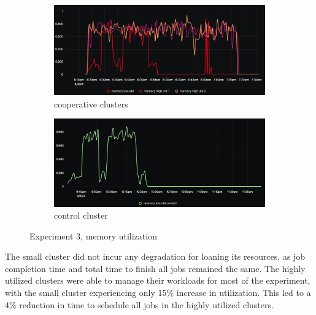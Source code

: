 \begin{figure}[H]
\centering
\begin{subfigure}{.5\textwidth}
  \centering
  \includegraphics[width=.9\linewidth]{./figures/experiment-three/cooperative.png}
  \caption{cooperative clusters}
  \label{fig:exp3coop}
\end{subfigure}%
\begin{subfigure}{.5\textwidth}
  \centering
  \includegraphics[width=.9\linewidth]{./figures/experiment-three/control.png}
  \caption{control cluster}
  \label{fig:exp3control}
\end{subfigure}
\caption{Experiment 3, memory utilization}
\label{fig:exp3memutil}
\end{figure}

The small cluster did not incur any degradation for loaning its resources, as
job completion time and total time to finish all jobs remained the same. The
highly utilized clusters were able to manage their workloads for most of the
experiment, with the small cluster experiencing only 15\% increase in
utilization. This led to a  4\% reduction in time to schedule all jobs in the
highly utilized clusters. 



%
%
